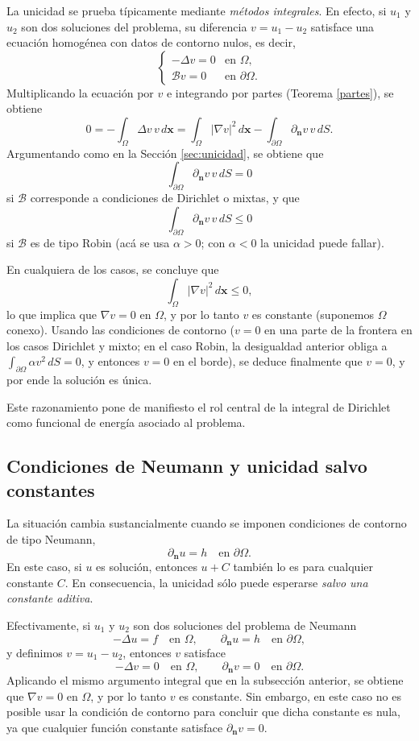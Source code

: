 \documentclass[12pt, a4paper]{amsbook}
\newcommand{\n}{{\mathbf n}}
\newcommand{\xx}{{\mathbf x}}
\theoremstyle{remark}
\theoremstyle{definition}
\numberwithin{section}{chapter}
\numberwithin{subsection}{section}
\numberwithin{equation}{section}
\numberwithin{figure}{chapter}
\begin{document}
La unicidad se prueba típicamente mediante \emph{métodos integrales}. En efecto, si $u_1$ y $u_2$ son dos soluciones del problema, su diferencia $v = u_1 - u_2$ satisface una ecuación homogénea con datos de contorno nulos, es decir,
\[
\begin{cases}
-\Delta v = 0 & \text{en } \Omega,\\
\mathcal{B}v = 0 & \text{en } \partial \Omega.
\end{cases}
\]
Multiplicando la ecuación por $v$ e integrando por partes (Teorema \ref{partes}), se obtiene
\[
0 = -\int_\Omega \Delta v\, v\, d\xx
   = \int_\Omega |\nabla v|^2\, d\xx
     - \int_{\partial\Omega} \partial_\n v\, v\, dS.
\]
Argumentando como en la Sección \ref{sec:unicidad}, se obtiene que
\[
\int_{\partial\Omega} \partial_\n v\, v\, dS = 0
\]
si $\mathcal{B}$ corresponde a condiciones de Dirichlet o mixtas, y que
\[
\int_{\partial\Omega} \partial_\n v\, v\, dS \le 0
\]
si $\mathcal{B}$ es de tipo Robin (acá se usa $\alpha>0$; con $\alpha<0$ la unicidad puede fallar).

En cualquiera de los casos, se concluye que
\[
\int_\Omega |\nabla v|^2\, d\xx \le 0,
\]
lo que implica que $\nabla v = 0$ en $\Omega$, y por lo tanto $v$ es constante (suponemos $\Omega$ conexo). Usando las condiciones de contorno ($v=0$ en una parte de la frontera en los casos Dirichlet y mixto; en el caso Robin, la desigualdad anterior obliga a $\int_{\partial\Omega}\alpha v^2\,dS = 0$, y entonces $v=0$ en el borde), se deduce finalmente que $v=0$, y por ende la solución es única.

Este razonamiento pone de manifiesto el rol central de la integral de Dirichlet como funcional de energía asociado al problema.

\subsection{Condiciones de Neumann y unicidad salvo constantes}

La situación cambia sustancialmente cuando se imponen condiciones de contorno de tipo Neumann,
\[
\partial_\n u = h \quad \text{en } \partial \Omega.
\]
En este caso, si $u$ es solución, entonces $u+C$ también lo es para cualquier constante $C$. En consecuencia, la unicidad sólo puede esperarse \emph{salvo una constante aditiva}.

Efectivamente, si $u_1$ y $u_2$ son dos soluciones del problema de Neumann
\[
-\Delta u = f \quad \text{en } \Omega,
\qquad
\partial_\n u = h \quad \text{en } \partial\Omega,
\]
y definimos $v = u_1 - u_2$, entonces $v$ satisface
\[
-\Delta v = 0 \quad \text{en } \Omega,
\qquad
\partial_\n v = 0 \quad \text{en } \partial\Omega.
\]
Aplicando el mismo argumento integral que en la subsección anterior, se obtiene que $\nabla v = 0$ en $\Omega$, y por lo tanto $v$ es constante. Sin embargo, en este caso no es posible usar la condición de contorno para concluir que dicha constante es nula, ya que cualquier función constante satisface $\partial_\n v = 0$.
\end{document}
